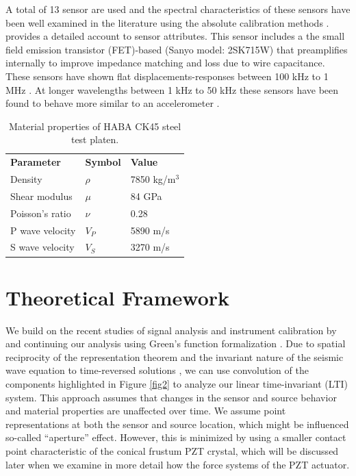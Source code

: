 \documentclass[preprint,3p, 11pt,authoryear]{elsarticle}
\begin{document}
A total of 13 sensor are used and the spectral characteristics of these sensors have been well examined in the literature using the absolute calibration methods \citep{Glaser1998, McLaskey2010, McLaskey2012, Selvadurai2015, Selvadurai2019, Wu}. \citet{Glaser1998} provides a detailed account to sensor attributes. This sensor includes a the small field emission transistor (FET)-based (Sanyo model: 2SK715W) that preamplifies internally to improve impedance matching and loss due to wire capacitance.  These sensors have shown flat displacements-responses between 100 kHz to 1 MHz \citep{McLaskey2012, Selvadurai2019}.  At longer wavelengths between 1 kHz to 50 kHz these sensors have been found to behave more similar to an accelerometer \citep{Wu}.

\begin{table}[ht]
	\centering
	\caption{Material properties of HABA CK45 steel test platen.}
	\begin{tabular}{ m{5cm} m{2cm} m{4cm}} 
		\hline  
		\bf{Parameter} 			& \bf{Symbol} 		& \bf{Value}	\\
	    Density                 	& $\rho$            & 7850 kg/m$^{3}$\\
	    Shear modulus        & $\mu$             & 84 GPa \\
	    Poisson's ratio         & $\nu$             & 0.28\\
	    P wave velocity       & $V_{P}$           & 5890 m/s\\
	    S wave velocity       & $V_{S}$           & 3270 m/s\\	    
		\hline  	
	\end{tabular}
	\label{table1}
\end{table}

\section{Theoretical Framework}
\label{theo}

We build on the recent studies of signal analysis and instrument calibration by \citet{McLaskey2012} and continuing our analysis using Green's function formalization \citep{Aki2002, Johnson1974}. Due to spatial reciprocity of the representation theorem \citep{Aki2002} and the invariant nature of the seismic wave equation to time-reversed solutions \citep{Fink1992}, we can use convolution of the components highlighted in Figure \ref{fig2} to analyze our linear time-invariant (LTI) system. This approach assumes that changes in the sensor and source behavior and material properties are unaffected over time.  We assume point representations at both the sensor and source location, which might be influenced so-called ``aperture'' effect. However, this is minimized by using a smaller contact point characteristic of the conical frustum PZT crystal, which will be discussed later when we examine in more detail how the force systems of the PZT actuator.
\end{document}
